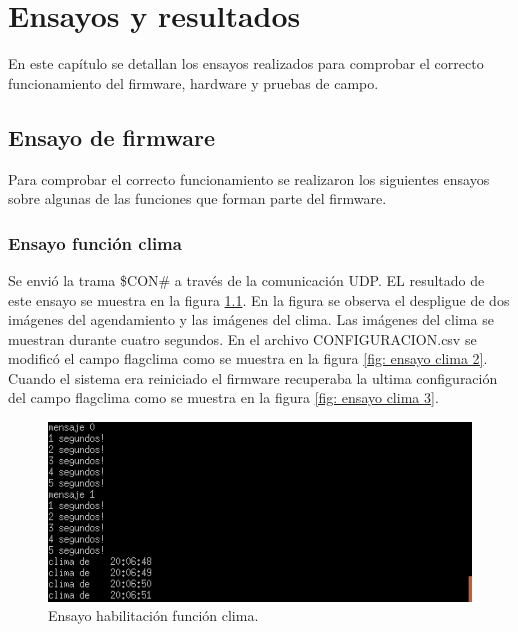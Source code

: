 
\chapter{Ensayos y resultados} %

\label{Chapter4} %


En este capítulo se detallan los ensayos realizados para comprobar el correcto funcionamiento del firmware, hardware y pruebas de campo.
\section{Ensayo de firmware}
Para comprobar el correcto funcionamiento se realizaron los siguientes ensayos sobre algunas de las funciones que forman parte del firmware.
\subsection{Ensayo función clima}
Se envió la trama \$CON\# a través de la comunicación UDP. EL resultado de este ensayo se muestra en la figura \ref{fig: ensayo clima 1}. En la figura se observa el despligue de dos imágenes del agendamiento y las imágenes del clima. Las imágenes del clima se muestran durante cuatro segundos. En el archivo CONFIGURACION.csv se modificó el campo flagclima como se muestra en la figura \ref{fig: ensayo clima 2}. Cuando el sistema era reiniciado el firmware recuperaba la ultima configuración del campo flagclima como se muestra en la figura \ref{fig: ensayo clima 3}. 

\begin{figure}[htpb]
	\centering
	\includegraphics[scale=0.8]{Figures/pruebaclima1.png} 
	\caption{Ensayo habilitación función clima.}
	\label{fig: ensayo clima 1}
\end{figure}

